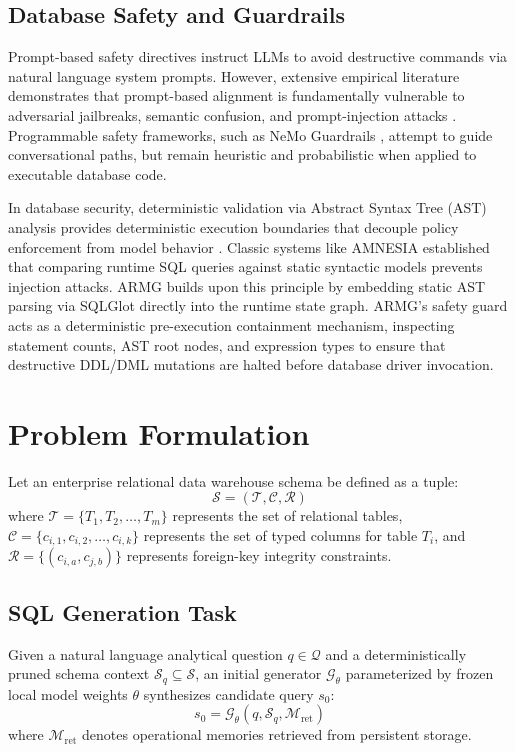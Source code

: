 \subsection{Database Safety and Guardrails}
Prompt-based safety directives instruct LLMs to avoid destructive commands via natural language system prompts. However, extensive empirical literature demonstrates that prompt-based alignment is fundamentally vulnerable to adversarial jailbreaks, semantic confusion, and prompt-injection attacks \cite{wei2023jailbroken, zou2023universal}. Programmable safety frameworks, such as NeMo Guardrails \cite{rebedea2023nemoguardrails}, attempt to guide conversational paths, but remain heuristic and probabilistic when applied to executable database code.

In database security, deterministic validation via Abstract Syntax Tree (AST) analysis provides deterministic execution boundaries that decouple policy enforcement from model behavior \cite{mao2023sqlglot, halfond2005amnesia}. Classic systems like AMNESIA \cite{halfond2005amnesia} established that comparing runtime SQL queries against static syntactic models prevents injection attacks. ARMG builds upon this principle by embedding static AST parsing via SQLGlot \cite{mao2023sqlglot} directly into the runtime state graph. ARMG's safety guard acts as a deterministic pre-execution containment mechanism, inspecting statement counts, AST root nodes, and expression types to ensure that destructive DDL/DML mutations are halted before database driver invocation.

\section{Problem Formulation}

Let an enterprise relational data warehouse schema be defined as a tuple:
\begin{equation}
\mathcal{S} = (\mathcal{T}, \mathcal{C}, \mathcal{R})
\end{equation}
where $\mathcal{T} = \{T_1, T_2, \dots, T_m\}$ represents the set of relational tables, $\mathcal{C} = \{c_{i,1}, c_{i,2}, \dots, c_{i,k}\}$ represents the set of typed columns for table $T_i$, and $\mathcal{R} = \{(c_{i,a}, c_{j,b})\}$ represents foreign-key integrity constraints.

\subsection{SQL Generation Task}
Given a natural language analytical question $q \in \mathcal{Q}$ and a deterministically pruned schema context $\mathcal{S}_q \subseteq \mathcal{S}$, an initial generator $\mathcal{G}_{\theta}$ parameterized by frozen local model weights $\theta$ synthesizes candidate query $s_0$:
\begin{equation}
s_0 = \mathcal{G}_{\theta}(q, \mathcal{S}_q, \mathcal{M}_{\text{ret}})
\end{equation}
where $\mathcal{M}_{\text{ret}}$ denotes operational memories retrieved from persistent storage.

